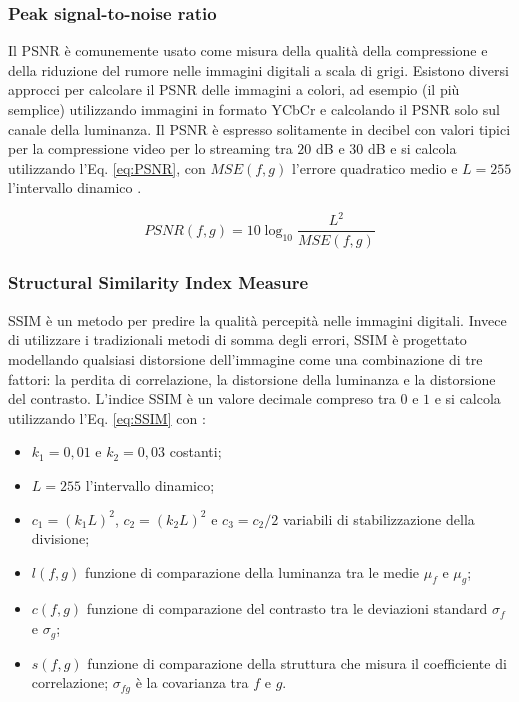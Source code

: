 \subsubsection{Peak signal-to-noise ratio}
Il PSNR è comunemente usato come misura della qualità della compressione e della riduzione del rumore nelle immagini digitali a scala di grigi. Esistono diversi approcci per calcolare il PSNR delle immagini a colori, ad esempio (il più semplice) utilizzando immagini in formato YCbCr e calcolando il PSNR solo sul canale della luminanza. Il PSNR è espresso solitamente in decibel con valori tipici per la compressione video per lo streaming tra $20$ \si{dB} e $30$ \si{dB} \parencite{ThomosN2006OtoJ} e si calcola utilizzando l'Eq. \ref{eq:PSNR}, con $MSE(f,g)$ l'errore quadratico medio e $L = 255$ l'intervallo dinamico \parencite{AnewcombinedPSNRforobjectivevideoqualityassessment}.

\begin{equation} \label{eq:PSNR}
	PSNR(f,g)=10 \log_{10}  \frac{L^2}{MSE(f,g)}	
\end{equation}



\subsubsection{Structural Similarity Index Measure}
SSIM è un metodo per predire la qualità percepità nelle immagini digitali. Invece di utilizzare i tradizionali metodi di somma degli errori, SSIM è progettato modellando qualsiasi distorsione dell'immagine come una combinazione di tre fattori: la perdita di correlazione, la distorsione della luminanza e la distorsione del contrasto. L'indice SSIM è un valore decimale compreso tra $0$ e $1$ e si calcola utilizzando l'Eq. \ref{eq:SSIM} con \parencite{relationship_PSNR_and_SSI}:

\begin{itemize}
	\item $k_1 = 0,01$ e $k_2 = 0,03$ costanti;
	\item $L = 255$ l'intervallo dinamico;
	\item $c_1 = (k_1 L)^2$, $c_2 = (k_2 L)^2$ e $c_3 = c_2/2$ variabili di stabilizzazione della divisione;
	\item $l(f,g)$ funzione di comparazione della luminanza tra le medie $\mu_f$ e $\mu_g$;
	\item $c(f,g)$ funzione di comparazione del contrasto tra le deviazioni standard $\sigma_f$ e $\sigma_g$;
	\item $s(f,g)$ funzione di comparazione della struttura che misura il coefficiente di correlazione; $\sigma_{fg}$ è la covarianza tra $f$ e $g$.
\end{itemize}

